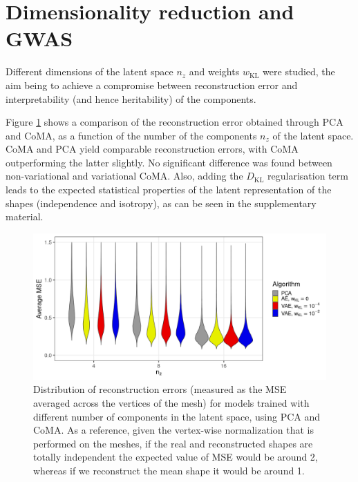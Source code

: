 \documentclass[fleqn,10pt]{wlscirep}
\begin{document}
\section{Dimensionality reduction and GWAS}

Different dimensions of the latent space $n_z$ and weights $w_{\textrm{KL}}$ were studied, the aim being to achieve a compromise between reconstruction error and interpretability (and hence heritability) of the components.

Figure \ref{fig:pca_vs_coma} shows a comparison of the reconstruction error obtained through PCA and CoMA, as a function of the number of the components $n_z$ of the latent space. CoMA and PCA yield comparable reconstruction errors, with CoMA outperforming the latter slightly. No significant difference was found between non-variational and variational CoMA.
Also, adding the $D_\textrm{KL}$ regularisation term leads to the expected statistical properties of the latent representation of the shapes (independence and isotropy), as can be seen in the supplementary material.

\begin{figure}[ht!]
\includegraphics[width=\linewidth]{figs/performance.png}
\caption{Distribution of reconstruction errors (measured as the MSE averaged across the vertices of the mesh) for models trained with different number of components in the latent space, using PCA and CoMA. As a reference, given the vertex-wise normalization that is performed on the meshes, if the real and reconstructed shapes are totally independent the expected value of MSE would be around 2, whereas if we reconstruct the mean shape it would be around 1.}
\label{fig:pca_vs_coma}
\end{figure}
\end{document}
